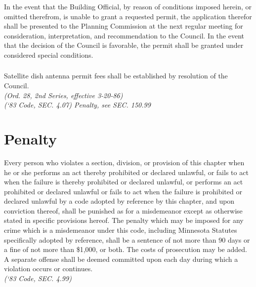 \subsubsection{}
In the event that the Building Official, by reason of conditions imposed herein, or omitted therefrom, is unable to grant a requested permit, the application therefor shall be presented to the Planning Commission at the next regular meeting for consideration, interpretation, and recommendation to the Council.  In the event that the decision of the Council is favorable, the permit shall be granted under considered special conditions.
\subsubsection{}
Satellite dish antenna permit fees shall be established by resolution of the Council.\\
\emph{(Ord. 28, 2nd Series, effective 3-20-86)}\\
\emph{(‘83 Code, SEC. 4.07)  Penalty, see SEC. 150.99}

\setcounter{section}{98}
\section{Penalty}
Every person who violates a section, division, or provision of this chapter when he or she performs an act thereby prohibited or declared unlawful, or fails to act when the failure is thereby prohibited or declared unlawful, or performs an act prohibited or declared unlawful or fails to act when the failure is prohibited or declared unlawful by a code adopted by reference by this chapter, and upon conviction thereof, shall be punished as for a misdemeanor except as otherwise stated in specific provisions hereof. The penalty which may be imposed for any crime which is a misdemeanor under this code, including Minnesota Statutes specifically adopted by reference, shall be a sentence of not more than 90 days or a fine of not more than \$1,000, or both. The costs of prosecution may be added. A separate offense shall be deemed committed upon each day during which a violation occurs or continues.\\
\emph{(‘83 Code, SEC. 4.99)}
